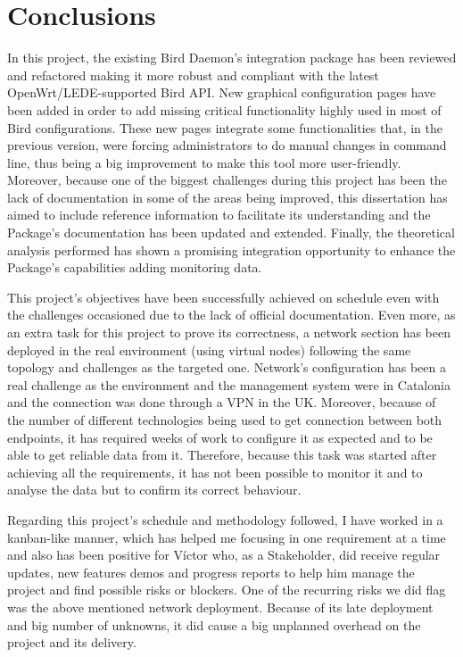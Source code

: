 \chapter{Conclusions}
\label{ch:conclusions}
In this project, the existing Bird Daemon's integration package has been reviewed and refactored making it more robust and compliant with the latest OpenWrt/LEDE-supported Bird API. New graphical configuration pages have been added in order to add missing critical functionality highly used in most of Bird configurations. 
These new pages integrate some functionalities that, in the previous version, were forcing administrators to do manual changes in command line, thus being a big improvement to make this tool more user-friendly. Moreover, because one of the biggest challenges during this project has been the lack of documentation in some of the areas being improved, this dissertation has aimed to include reference information to facilitate its understanding and the Package's documentation has been updated and extended.
Finally, the theoretical analysis performed has shown a promising integration opportunity to enhance the Package's capabilities adding monitoring data.

This project's objectives have been successfully achieved on schedule even with the challenges occasioned due to the lack of official documentation. Even more, as an extra task for this project to prove its correctness, a network section has been deployed in the real environment (using virtual nodes) following the same topology and challenges as the targeted one. Network's configuration has been a real challenge as the environment and the management system were in Catalonia and the connection was done through a VPN in the UK. Moreover, because of the number of different technologies being used to get connection between both endpoints, it has required weeks of work to configure it as expected and to be able to get reliable data from it. Therefore, because this task was started after achieving all the requirements, it has not been possible to monitor it and to analyse the data but to confirm its correct behaviour.

Regarding this project's schedule and methodology followed, I have worked in a kanban-like manner, which has helped me focusing in one requirement at a time and also has been positive for V\'{i}ctor who, as a Stakeholder, did receive regular updates, new features demos and progress reports to help him manage the project and find possible risks or blockers. One of the recurring risks we did flag was the above mentioned network deployment. Because of its late deployment and  big number of unknowns, it did cause a big unplanned overhead on the project and its delivery.

